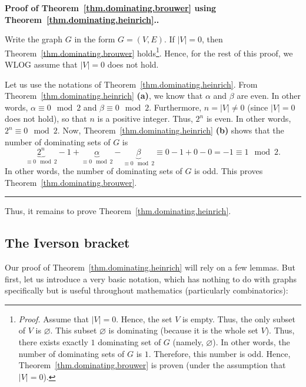 \documentclass[numbers=enddot,12pt,final,onecolumn,notitlepage]{scrartcl}%
\theoremstyle{definition}
\newenvironment{proof}[1][Proof]{\noindent\textbf{#1.} }{\ \rule{0.5em}{0.5em}}
\newcommand{\abs}[1]{\left| #1 \right|}
\newcommand{\tup}[1]{\left( #1 \right)}
\begin{document}
\begin{proof}[Proof of Theorem~\ref{thm.dominating.brouwer} using
Theorem~\ref{thm.dominating.heinrich}.]

Write the graph $G$ in the form $G = \tup{V, E}$. If $\abs{V} = 0$,
then Theorem~\ref{thm.dominating.brouwer}
holds\footnote{\textit{Proof.} Assume that $\abs{V} = 0$. Hence,
the set $V$ is empty. Thus, the only subset of $V$ is $\varnothing$.
This subset $\varnothing$ is dominating (because it is the whole
set $V$). Thus, there exists exactly $1$ dominating set of $G$
(namely, $\varnothing$). In other words, the number of dominating
sets of $G$ is $1$. Therefore, this number is odd. Hence,
Theorem~\ref{thm.dominating.brouwer} is proven (under the assumption
that $\abs{V} = 0$).}. Hence, for the rest of this proof, we
WLOG assume that $\abs{V} = 0$ does not hold.

Let us use the notations of Theorem~\ref{thm.dominating.heinrich}.
From Theorem~\ref{thm.dominating.heinrich} \textbf{(a)}, we know
that $\alpha$ and $\beta$ are even. In other words,
$\alpha \equiv 0 \mod 2$ and $\beta \equiv 0 \mod 2$.
Furthermore, $n = \abs{V} \neq 0$ (since $\abs{V} = 0$ does not
hold), so that $n$ is a positive integer. Thus, $2^n$ is even.
In other words, $2^n \equiv 0 \mod 2$. Now,
Theorem~\ref{thm.dominating.heinrich} \textbf{(b)} shows that
the number of dominating sets of $G$ is
\[
\underbrace{2^n}_{\equiv 0 \mod 2} - 1
  + \underbrace{\alpha}_{\equiv 0 \mod 2}
  - \underbrace{\beta}_{\equiv 0 \mod 2}
\equiv 0 - 1 + 0 - 0 = -1 \equiv 1 \mod 2.
\]
In other words, the number of dominating sets of $G$ is odd.
This proves Theorem~\ref{thm.dominating.brouwer}.
\end{proof}

Thus, it remains to prove Theorem~\ref{thm.dominating.heinrich}.

\subsection{\label{subsect.dominating.iverson}The Iverson bracket}

Our proof of Theorem~\ref{thm.dominating.heinrich} will rely on
a few lemmas. But first, let us introduce a very basic notation, which
has nothing to do with graphs specifically but is useful
throughout mathematics (particularly combinatorics):
\end{document}

